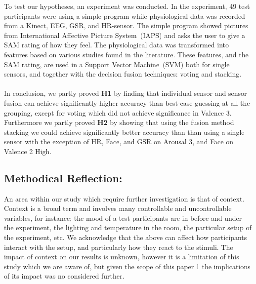 To test our hypotheses, an experiment was conducted. In the experiment, 49 test participants were using a simple program
while physiological data was recorded from a Kinect, EEG, GSR, and HR-sensor. The simple program showed pictures from
International Affective Picture System~(IAPS)\cite{iaps} and asks the user to give a SAM rating of how they feel.
The physiological data was transformed into features based on various studies found in the literature. 
These features, and the SAM rating, are used in a Support Vector Machine~(SVM) both for single sensors, and together with the decision fusion techniques: voting and stacking.\\\\
In conclusion, we partly proved \textbf{H1} by finding that individual sensor and sensor fusion can achieve significantly higher accuracy than best-case guessing at all the grouping, except for voting which did not achieve significance in Valence 3.
Furthermore we partly proved \textbf{H2} by showing that using the fusion method stacking we could achieve significantly better accuracy than than using a single sensor with the exception of HR, Face, and GSR on Arousal 3, and Face on Valence 2 High.

\subsection{Methodical Reflection:}
An area within our study which require further investigation is
that of context. Context is a broad term and involves many controllable and
uncontrollable variables, for instance; the mood\cite{definition_emotions} of a test participants are in
before and under the experiment, the lighting and temperature in the room, the
particular setup of the experiment, etc. 
We acknowledge that the above can affect how participants interact with the setup, and particularly how they
react to the stimuli. 
The impact of context on our results is unknown, however it is a limitation of this study which we are aware of, but given the scope of this paper 1 the implications of its impact was no considered further.\\\\

